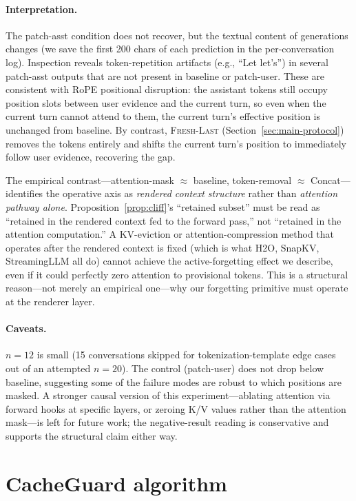 \documentclass{article}
\begin{document}
\paragraph{Interpretation.}
The patch-asst condition does not recover, but the textual content of generations changes (we save the first 200 chars of each prediction in the per-conversation log). Inspection reveals token-repetition artifacts (e.g., ``Let let's'') in several patch-asst outputs that are not present in baseline or patch-user. These are consistent with RoPE positional disruption: the assistant tokens still occupy position slots between user evidence and the current turn, so even when the current turn cannot attend to them, the current turn's effective position is unchanged from baseline. By contrast, \textsc{Fresh-Last} (Section~\ref{sec:main-protocol}) removes the tokens entirely and shifts the current turn's position to immediately follow user evidence, recovering the gap.

The empirical contrast---attention-mask $\approx$ baseline, token-removal $\approx$ Concat---identifies the operative axis as \emph{rendered context structure} rather than \emph{attention pathway alone}. Proposition~\ref{prop:cliff}'s ``retained subset'' must be read as ``retained in the rendered context fed to the forward pass,'' not ``retained in the attention computation.'' A KV-eviction or attention-compression method that operates after the rendered context is fixed (which is what H2O, SnapKV, StreamingLLM all do) cannot achieve the active-forgetting effect we describe, even if it could perfectly zero attention to provisional tokens. This is a structural reason---not merely an empirical one---why our forgetting primitive must operate at the renderer layer.

\paragraph{Caveats.}
$n{=}12$ is small (15 conversations skipped for tokenization-template edge cases out of an attempted $n{=}20$). The control (patch-user) does not drop below baseline, suggesting some of the failure modes are robust to which positions are masked. A stronger causal version of this experiment---ablating attention via forward hooks at specific layers, or zeroing K/V values rather than the attention mask---is left for future work; the negative-result reading is conservative and supports the structural claim either way.

\section{CacheGuard algorithm}
\label{app:algorithm}
\end{document}
